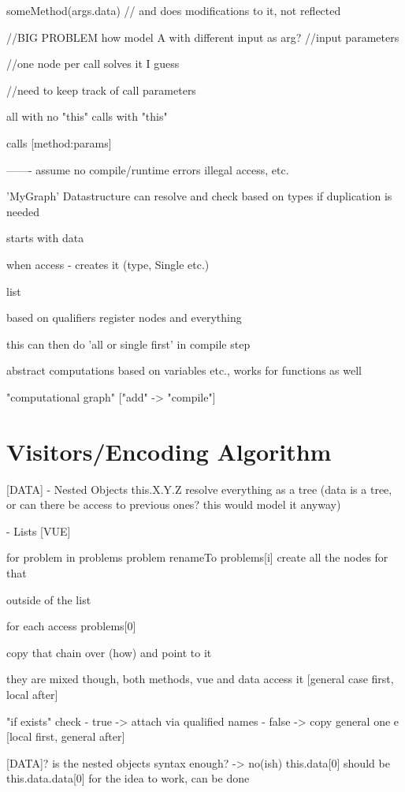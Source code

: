 someMethod(args.data) // and does modifications to it, not reflected 


//BIG PROBLEM how model A with different input as arg?
//input parameters


//one node per call solves it I guess

//need to keep track of call parameters

all with no "this"
calls with "this"

calls [method:params]





-------
assume no compile/runtime errors
illegal access, etc.

'MyGraph' Datastructure
can resolve and check based on types if duplication is needed

starts with data 

when access - creates it (type, Single etc.)

list 

based on qualifiers register nodes and everything
    
this can then do 'all or single first' in compile step


abstract computations based on variables etc., works for functions as well

"computational graph" ["add" -> "compile"]
 
\section{Visitors/Encoding Algorithm}

[DATA]
- Nested Objects
this.X.Y.Z
resolve everything as a tree (data is a tree, or can there be access to previous ones? this would model it anyway)



- Lists
[VUE]

for problem in problems
problem renameTo problems[i]
create all the nodes for that 


outside of the list

for each access
problems[0]

copy that chain over (how)
and point to it 


they are mixed though, both methods, vue and data access it 
[general case first, local after] 

"if exists" check
 - true -> attach via qualified names 
 - false -> copy general one e  
[local first, general after]

[DATA]? is the nested objects syntax enough? -> no(ish)
this.data[0] should be this.data.data[0] for the idea to work, can be done


